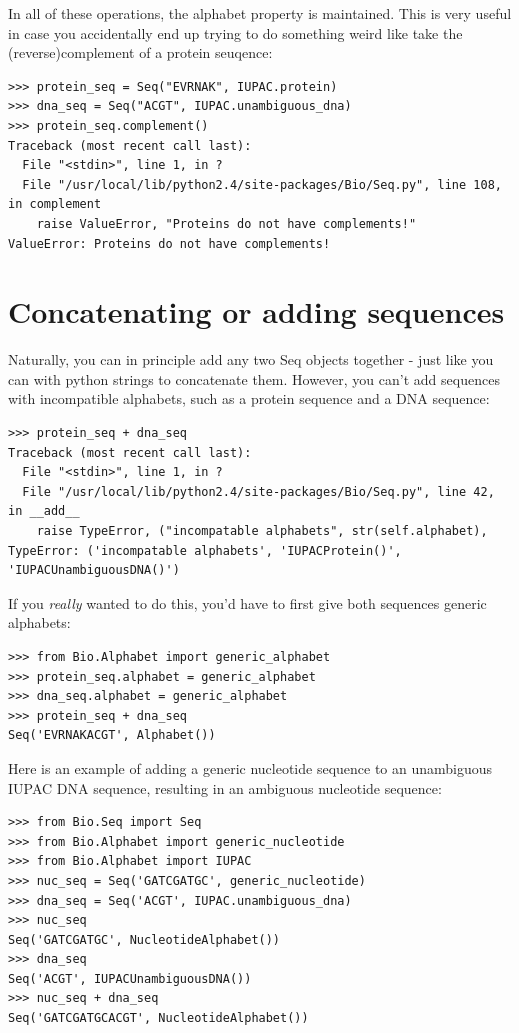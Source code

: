 \documentclass{report}
\begin{document}
In all of these operations, the alphabet property is maintained. This is very useful in case you accidentally end up trying to do something weird like take the (reverse)complement of a protein seuqence:

\begin{verbatim}
>>> protein_seq = Seq("EVRNAK", IUPAC.protein)
>>> dna_seq = Seq("ACGT", IUPAC.unambiguous_dna)
>>> protein_seq.complement()
Traceback (most recent call last):
  File "<stdin>", line 1, in ?
  File "/usr/local/lib/python2.4/site-packages/Bio/Seq.py", line 108, in complement
    raise ValueError, "Proteins do not have complements!"
ValueError: Proteins do not have complements!
\end{verbatim}

\section{Concatenating or adding sequences}

Naturally, you can in principle add any two Seq objects together - just like you can with python strings to concatenate them.  However, you can't add sequences with incompatible alphabets, such as a protein sequence and a DNA sequence:

\begin{verbatim}
>>> protein_seq + dna_seq
Traceback (most recent call last):
  File "<stdin>", line 1, in ?
  File "/usr/local/lib/python2.4/site-packages/Bio/Seq.py", line 42, in __add__
    raise TypeError, ("incompatable alphabets", str(self.alphabet),
TypeError: ('incompatable alphabets', 'IUPACProtein()', 'IUPACUnambiguousDNA()')
\end{verbatim}

If you \emph{really} wanted to do this, you'd have to first give both sequences generic alphabets:

\begin{verbatim}
>>> from Bio.Alphabet import generic_alphabet
>>> protein_seq.alphabet = generic_alphabet
>>> dna_seq.alphabet = generic_alphabet
>>> protein_seq + dna_seq
Seq('EVRNAKACGT', Alphabet())
\end{verbatim}

Here is an example of adding a generic nucleotide sequence to an unambiguous IUPAC DNA sequence, resulting in an ambiguous nucleotide sequence:

\begin{verbatim}
>>> from Bio.Seq import Seq
>>> from Bio.Alphabet import generic_nucleotide
>>> from Bio.Alphabet import IUPAC
>>> nuc_seq = Seq('GATCGATGC', generic_nucleotide)
>>> dna_seq = Seq('ACGT', IUPAC.unambiguous_dna)
>>> nuc_seq
Seq('GATCGATGC', NucleotideAlphabet())
>>> dna_seq
Seq('ACGT', IUPACUnambiguousDNA())
>>> nuc_seq + dna_seq
Seq('GATCGATGCACGT', NucleotideAlphabet())
\end{verbatim}
\end{document}
